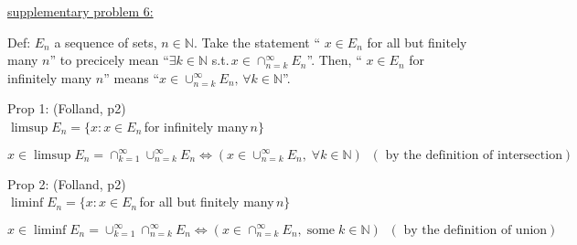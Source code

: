\documentclass[12pt]{article}
\begin{document}


\begin{flushleft}
\underline{supplementary problem 6:}
\end{flushleft}

\begin{flushleft}
Def: $E_n$ a sequence of sets, $n \in \mathbb{N}$. Take the statement `` $x \in E_n$ for all but finitely many $n$'' to precicely mean ``$\exists k \in \mathbb{N}$ s.t.$ \, x \in \cap_{n=k}^{\infty} E_n $''. Then, `` $x \in E_n$ for infinitely many $n$'' means ``$ x \in \cup_{n=k}^{\infty} E_n,\, \forall k \in \mathbb{N}$''.
\end{flushleft}

\begin{flushleft}
Prop 1: (Folland, p2) \\
$\limsup E_n = \{ x : x \in E_n \,$for infinitely many$\, n \}$
\end{flushleft}

\vspace{-0.4in}

\begin{equation*}
x \in \limsup E_n = \cap_{k=1}^{\infty} \cup_{n=k}^{\infty} E_n \Leftrightarrow \left( x \in \cup_{n=k}^{\infty} E_n, \; \forall k \in \mathbb{N} \right) \; \; \left( \textrm{ by the definition of intersection} \right )
\end{equation*}

\begin{flushleft}
Prop 2: (Folland, p2) \\
$\liminf E_n = \{ x : x \in E_n \,$for all but finitely many$\, n \}$
\end{flushleft}

\vspace{-0.4in}

\begin{equation*}
x \in \liminf E_n = \cup_{k=1}^{\infty} \cap_{n=k}^{\infty} E_n \Leftrightarrow \left( x \in \cap_{n=k}^{\infty} E_n, \; \textrm{some} \; k \in \mathbb{N} \right) \; \; \left( \textrm{ by the definition of union} \right )
\end{equation*}
\end{document}
